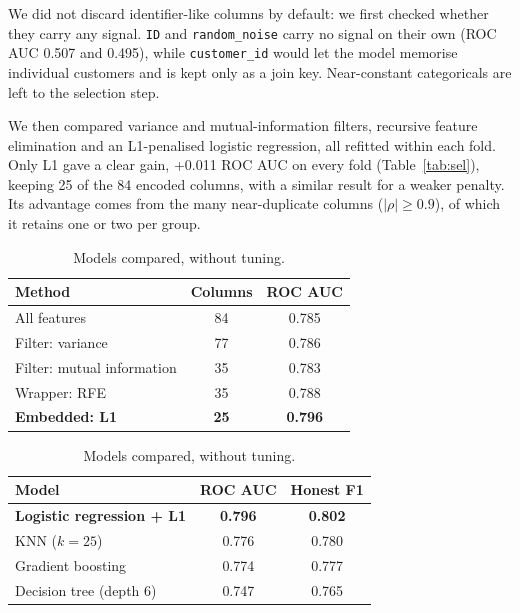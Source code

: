 \documentclass[10pt,a4paper]{article}
\renewcommand{\arraystretch}{1.3}
\begin{document}
We did not discard identifier-like columns by default: we first checked whether they carry any signal. \texttt{ID} and \texttt{random\_noise} carry no signal on their own (ROC AUC 0.507 and 0.495), while \texttt{customer\_id} would let the model memorise individual customers and is kept only as a join key. Near-constant categoricals are left to the selection step.

We then compared variance and mutual-information filters, recursive feature elimination and an L1-penalised logistic regression, all refitted within each fold. Only L1 gave a clear gain, +0.011 ROC AUC on every fold (Table~\ref{tab:sel}), keeping 25 of the 84 encoded columns, with a similar result for a weaker penalty. Its advantage comes from the many near-duplicate columns ($|\rho| \geq 0.9$), of which it retains one or two per group.

\begin{table}[h]
\centering\small
\renewcommand{\arraystretch}{1.2}
\begin{minipage}[t]{0.47\linewidth}\centering
\caption{Feature selection (logistic regression).}\label{tab:sel}
\begin{tabular}{@{}lcc@{}}
\toprule
Method & Columns & ROC AUC \\ \midrule
All features & 84 & 0.785 \\
Filter: variance & 77 & 0.786 \\
Filter: mutual information & 35 & 0.783 \\
Wrapper: RFE & 35 & 0.788 \\
\textbf{Embedded: L1} & \textbf{25} & \textbf{0.796} \\
\bottomrule
\end{tabular}
\end{minipage}\hfill
\begin{minipage}[t]{0.47\linewidth}\centering
\caption{Models compared, without tuning.}\label{tab:models}
\begin{tabular}{@{}lcc@{}}
\toprule
Model & ROC AUC & Honest F1 \\ \midrule
\textbf{Logistic regression + L1} & \textbf{0.796} & \textbf{0.802} \\
KNN ($k=25$) & 0.776 & 0.780 \\
Gradient boosting & 0.774 & 0.777 \\
Decision tree (depth 6) & 0.747 & 0.765 \\
\bottomrule
\end{tabular}
\end{minipage}
\end{table}
\end{document}
